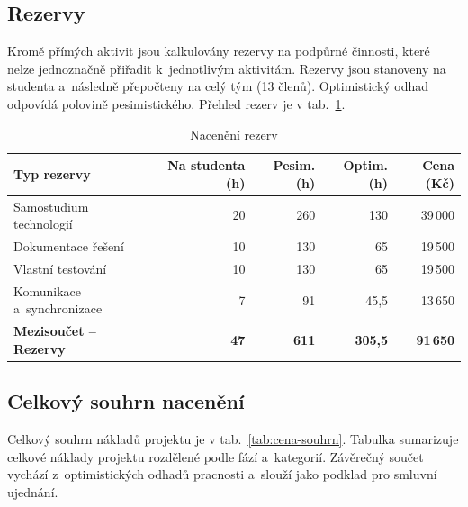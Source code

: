 \documentclass[a4paper, 11pt]{article}
\begin{document}
\subsection{Rezervy}

Kromě přímých aktivit jsou kalkulovány rezervy na podpůrné činnosti, které nelze jednoznačně přiřadit k~jednotlivým aktivitám. Rezervy jsou stanoveny na studenta a~následně přepočteny na celý tým (13 členů). Optimistický odhad odpovídá polovině pesimistického. Přehled rezerv je v tab.~\ref{tab:cena-rezervy}.

\begin{table}[H]
\centering\small
\begin{tabularx}{\textwidth}{X r r r r}
\toprule
\textbf{Typ rezervy} & \textbf{Na studenta (h)} & \textbf{Pesim. (h)} & \textbf{Optim. (h)} & \textbf{Cena (Kč)} \\
\midrule
Samostudium technologií & 20 & 260 & 130 & 39\,000 \\
Dokumentace řešení & 10 & 130 & 65 & 19\,500 \\
Vlastní testování & 10 & 130 & 65 & 19\,500 \\
Komunikace a~synchronizace & 7 & 91 & 45,5 & 13\,650 \\
\midrule
\textbf{Mezisoučet -- Rezervy} & \textbf{47} & \textbf{611} & \textbf{305,5} & \textbf{91\,650} \\
\bottomrule
\end{tabularx}
\caption{Nacenění rezerv}
\label{tab:cena-rezervy}
\end{table}

\subsection{Celkový souhrn nacenění}

Celkový souhrn nákladů projektu je v tab.~\ref{tab:cena-souhrn}.
Tabulka sumarizuje celkové náklady projektu rozdělené podle fází a~kategorií. Závěrečný součet vychází z~optimistických odhadů pracnosti a~slouží jako podklad pro smluvní ujednání.
\end{document}
